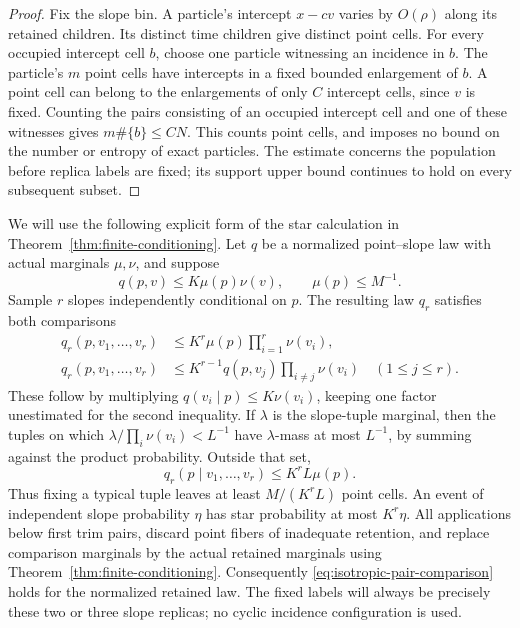 \begin{proof}
Fix the slope bin. A particle's intercept $x-cv$ varies by $O(\rho)$ along its
retained children. Its distinct time children give distinct point cells.
For every occupied intercept cell $b$, choose one particle witnessing an
incidence in $b$. The particle's $m$ point cells have intercepts in a fixed
bounded enlargement of $b$. A point cell can belong to the enlargements of
only $C$ intercept cells, since $v$ is fixed. Counting the pairs consisting of
an occupied intercept cell and one of these witnesses gives $m\#\{b\}\leq CN$.
This counts point cells, and imposes no bound on the number or entropy of exact
particles. The estimate concerns the population before replica labels are
fixed; its support upper bound continues to hold on every subsequent subset.
\end{proof}

We will use the following explicit form of the star calculation in
Theorem~\ref{thm:finite-conditioning}. Let $q$ be a normalized point--slope law
with actual marginals $\mu,\nu$, and suppose
\begin{equation}
 q(p,v)\leq K\mu(p)\nu(v),\qquad \mu(p)\leq M^{-1}.
 \label{eq:isotropic-pair-comparison}
\end{equation}
Sample $r$ slopes independently conditional on $p$. The resulting law $q_r$
satisfies both comparisons
\begin{align}
 q_r(p,v_1,\ldots,v_r)&\leq K^r\mu(p)\prod_{i=1}^r\nu(v_i),
 \label{eq:isotropic-star-comparison}\\
 q_r(p,v_1,\ldots,v_r)&\leq
 K^{r-1}q(p,v_j)\prod_{i\ne j}\nu(v_i)\quad(1\leq j\leq r).
 \label{eq:isotropic-one-pair-comparison}
\end{align}
These follow by multiplying $q(v_i\mid p)\leq K\nu(v_i)$, keeping one factor
unestimated for the second inequality. If $\lambda$ is the slope-tuple marginal,
then the tuples on which $\lambda/\prod_i\nu(v_i)<L^{-1}$ have
$\lambda$-mass at most $L^{-1}$, by summing against the product probability.
Outside that set,
\begin{equation}
 q_r(p\mid v_1,\ldots,v_r)\leq K^r L\mu(p).
 \label{eq:isotropic-pinning}
\end{equation}
Thus fixing a typical tuple leaves at least $M/(K^rL)$ point cells. An event
of independent slope probability $\eta$ has star probability at most $K^r\eta$.
All applications below first trim pairs, discard point fibers of inadequate
retention, and replace comparison marginals by the actual retained marginals
using Theorem~\ref{thm:finite-conditioning}. Consequently
\eqref{eq:isotropic-pair-comparison} holds for the normalized retained law.
The fixed labels will always be precisely these two or three slope replicas;
no cyclic incidence configuration is used.

